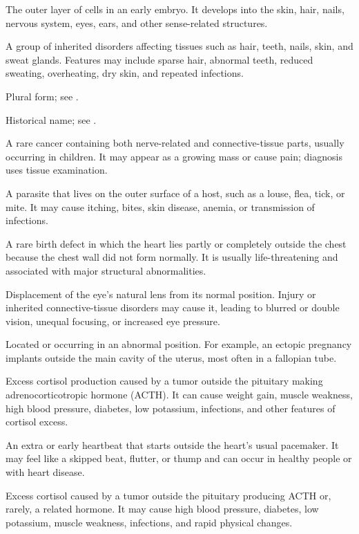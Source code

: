  The outer layer of cells in an early embryo. It develops into the skin, hair, nails, nervous system, eyes, ears, and other sense-related structures.

 A group of inherited disorders affecting tissues such as hair, teeth, nails, skin, and sweat glands. Features may include sparse hair, abnormal teeth, reduced sweating, overheating, dry skin, and repeated infections.

 Plural form; see .

 Historical name; see .

 A rare cancer containing both nerve-related and connective-tissue parts, usually occurring in children. It may appear as a growing mass or cause pain; diagnosis uses tissue examination.

 A parasite that lives on the outer surface of a host, such as a louse, flea, tick, or mite. It may cause itching, bites, skin disease, anemia, or transmission of infections.

 A rare birth defect in which the heart lies partly or completely outside the chest because the chest wall did not form normally. It is usually life-threatening and associated with major structural abnormalities.

 Displacement of the eye’s natural lens from its normal position. Injury or inherited connective-tissue disorders may cause it, leading to blurred or double vision, unequal focusing, or increased eye pressure.

 Located or occurring in an abnormal position. For example, an ectopic pregnancy implants outside the main cavity of the uterus, most often in a fallopian tube.

 Excess cortisol production caused by a tumor outside the pituitary making adrenocorticotropic hormone (ACTH). It can cause weight gain, muscle weakness, high blood pressure, diabetes, low potassium, infections, and other features of cortisol excess.

 An extra or early heartbeat that starts outside the heart’s usual pacemaker. It may feel like a skipped beat, flutter, or thump and can occur in healthy people or with heart disease.

 Excess cortisol caused by a tumor outside the pituitary producing ACTH or, rarely, a related hormone. It may cause high blood pressure, diabetes, low potassium, muscle weakness, infections, and rapid physical changes.


